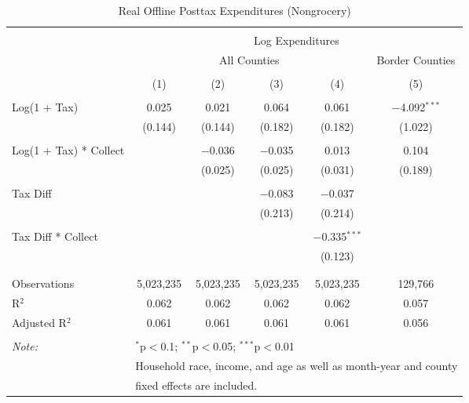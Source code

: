 
\begin{table}[!htbp] \centering 
  \caption{Real Offline Posttax Expenditures (Nongrocery)} 
  \label{} 
\begin{tabular}{@{\extracolsep{5pt}}lccccc} 
\\[-1.8ex]\hline 
\hline \\[-1.8ex] 
 & \multicolumn{5}{c}{Log Expenditures} \\ 
\cline{2-6} 
 & \multicolumn{4}{c}{All Counties} & Border Counties \\ 
\\[-1.8ex] & (1) & (2) & (3) & (4) & (5)\\ 
\hline \\[-1.8ex] 
 Log(1 + Tax) & 0.025 & 0.021 & 0.064 & 0.061 & $-$4.092$^{***}$ \\ 
  & (0.144) & (0.144) & (0.182) & (0.182) & (1.022) \\ 
  & & & & & \\ 
 Log(1 + Tax) * Collect &  & $-$0.036 & $-$0.035 & 0.013 & 0.104 \\ 
  &  & (0.025) & (0.025) & (0.031) & (0.189) \\ 
  & & & & & \\ 
 Tax Diff &  &  & $-$0.083 & $-$0.037 &  \\ 
  &  &  & (0.213) & (0.214) &  \\ 
  & & & & & \\ 
 Tax Diff * Collect &  &  &  & $-$0.335$^{***}$ &  \\ 
  &  &  &  & (0.123) &  \\ 
  & & & & & \\ 
\hline \\[-1.8ex] 
Observations & 5,023,235 & 5,023,235 & 5,023,235 & 5,023,235 & 129,766 \\ 
R$^{2}$ & 0.062 & 0.062 & 0.062 & 0.062 & 0.057 \\ 
Adjusted R$^{2}$ & 0.061 & 0.061 & 0.061 & 0.061 & 0.056 \\ 
\hline 
\hline \\[-1.8ex] 
\textit{Note:}  & \multicolumn{5}{l}{$^{*}$p$<$0.1; $^{**}$p$<$0.05; $^{***}$p$<$0.01} \\ 
 & \multicolumn{5}{l}{Household race, income, and age as well as month-year and county} \\ 
 & \multicolumn{5}{l}{fixed effects are included.} \\ 
\end{tabular} 
\end{table} 
